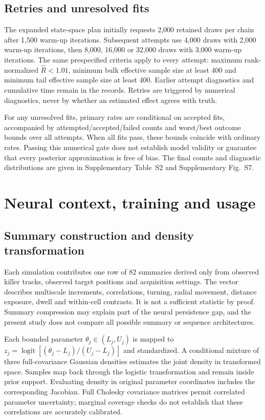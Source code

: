 \documentclass[11pt]{article}
\begin{document}
\subsection{Retries and unresolved fits}
The expanded state-space plan initially requests 2,000 retained draws per chain after 1,500 warm-up iterations. Subsequent attempts use 4,000 draws with 2,000 warm-up iterations, then 8,000, 16,000 or 32,000 draws with 3,000 warm-up iterations. The same prespecified criteria apply to every attempt: maximum rank-normalized $\widehat R<1.01$, minimum bulk effective sample size at least 400 and minimum tail effective sample size at least 400. Earlier attempt diagnostics and cumulative time remain in the records. Retries are triggered by numerical diagnostics, never by whether an estimated effect agrees with truth.

For any unresolved fits, primary rates are conditional on accepted fits, accompanied by attempted/accepted/failed counts and worst/best outcome bounds over all attempts. When all fits pass, these bounds coincide with ordinary rates. Passing this numerical gate does not establish model validity or guarantee that every posterior approximation is free of bias. The final counts and diagnostic distributions are given in Supplementary Table~S2 and Supplementary Fig.~S7.

\section{Neural context, training and usage}
\subsection{Summary construction and density transformation}
Each simulation contributes one row of 82 summaries derived only from observed killer tracks, observed target positions and acquisition settings. The vector describes multiscale increments, correlations, turning, radial movement, distance exposure, dwell and within-cell contrasts. It is not a sufficient statistic by proof. Summary compression may explain part of the neural persistence gap, and the present study does not compare all possible summary or sequence architectures.

Each bounded parameter $\theta_j\in(L_j,U_j)$ is mapped to $z_j=\operatorname{logit}[(\theta_j-L_j)/(U_j-L_j)]$ and standardized. A conditional mixture of three full-covariance Gaussian densities estimates the joint density in transformed space. Samples map back through the logistic transformation and remain inside prior support. Evaluating density in original parameter coordinates includes the corresponding Jacobian. Full Cholesky covariance matrices permit correlated parameter uncertainty; marginal coverage checks do not establish that these correlations are accurately calibrated.
\end{document}
